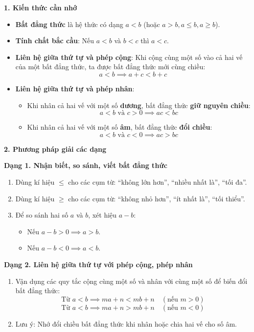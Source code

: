 \textbf{1. Kiến thức cần nhớ}
\begin{itemize}
\item \textbf{Bất đẳng thức} là hệ thức có dạng $a < b$ (hoặc $a > b, a \le b, a \ge b$).
\item \textbf{Tính chất bắc cầu}: Nếu $a < b$ và $b < c$ thì $\boxed{a < c}$.
\item \textbf{Liên hệ giữa thứ tự và phép cộng}: Khi cộng cùng một số vào cả hai vế của một bất đẳng thức, ta được bất đẳng thức mới cùng chiều:
$$\boxed{a < b \implies a + c < b + c}$$
\item \textbf{Liên hệ giữa thứ tự và phép nhân}:
\begin{itemize}
\item Khi nhân cả hai vế với một số \textbf{dương}, bất đẳng thức \textbf{giữ nguyên chiều}:
$$\boxed{a < b\text{ và } c > 0 \implies ac < bc}$$
\item Khi nhân cả hai vế với một số \textbf{âm}, bất đẳng thức \textbf{đổi chiều}:
$$\boxed{a < b\text{ và } c < 0 \implies ac > bc}$$
\end{itemize}
\end{itemize}

\textbf{2. Phương pháp giải các dạng}

\textbf{Dạng 1. Nhận biết, so sánh, viết bất đẳng thức}
\begin{enumerate}
\item Dùng kí hiệu $\le$ cho các cụm từ: ``không lớn hơn'', ``nhiều nhất là'', ``tối đa''.
\item Dùng kí hiệu $\ge$ cho các cụm từ: ``không nhỏ hơn'', ``ít nhất là'', ``tối thiểu''.
\item Để so sánh hai số $a$ và $b$, xét hiệu $a - b$:
\begin{itemize}
\item Nếu $a - b > 0 \implies a > b$.
\item Nếu $a - b < 0 \implies a < b$.
\end{itemize}
\end{enumerate}

\textbf{Dạng 2. Liên hệ giữa thứ tự với phép cộng, phép nhân}
\begin{enumerate}
\item Vận dụng các quy tắc cộng cùng một số và nhân với cùng một số để biến đổi bất đẳng thức:
$$\text{Từ } a < b \implies ma + n < mb + n\quad (\text{nếu } m > 0)$$
$$\text{Từ } a < b \implies ma + n > mb + n\quad (\text{nếu } m < 0)$$
\item Lưu ý: Nhớ đổi chiều bất đẳng thức khi nhân hoặc chia hai vế cho số âm.
\end{enumerate}

